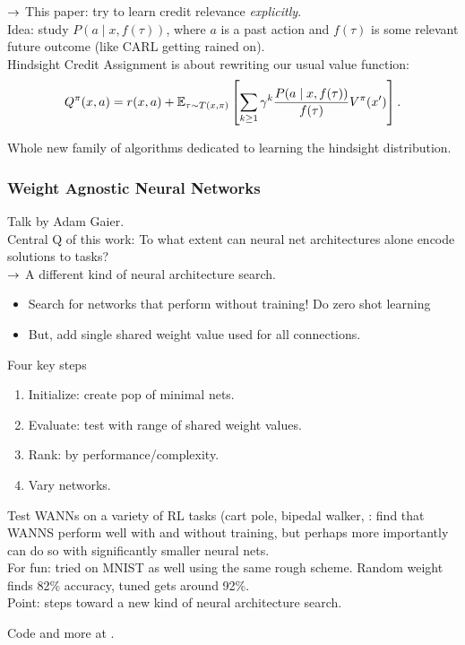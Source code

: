 $\rightarrow$ This paper: try to learn credit relevance {\it explicitly}. \\

Idea: study $P(a \mid x, f(\tau))$, where $a$ is a past action and $f(\tau)$ is some relevant future outcome (like CARL getting rained on). \\

Hindsight Credit Assignment is about rewriting our usual value function:
\begin{equation}
    Q^\pi(x,a) = r(x,a) + \mathbb{E}_{\tau \sim T(x,\pi)} \left[\sum_{k \geq 1} \gamma^k \frac{P(a \mid x, f(\tau))}{f(\tau)}V^\pi(x')\right].
\end{equation}

Whole new family of algorithms dedicated to learning the hindsight distribution.

\subsubsection{Weight Agnostic Neural Networks \cite{gaier2019weight}}

Talk by Adam Gaier. \\

Central Q of this work: To what extent can neural net architectures alone encode solutions to tasks? \\

$\rightarrow$ A different kind of neural architecture search.
\begin{itemize}
    \item Search for networks that perform without training! Do zero shot learning
    \item But, add single shared weight value used for all connections.
\end{itemize}

Four key steps
\begin{enumerate}
    \item Initialize: create pop of minimal nets.
    \item Evaluate: test with range of shared weight values.
    \item Rank: by performance/complexity.
    \item Vary networks.
\end{enumerate}

Test WANNs on a variety of RL tasks (cart pole, bipedal walker, : find that WANNS perform well with and without training, but perhaps more importantly can do so with significantly smaller neural nets. \\

For fun: tried on MNIST as well using the same rough scheme. Random weight finds 82\% accuracy, tuned gets around 92\%. \\

Point: steps toward a new kind of neural architecture search.

Code and more at .